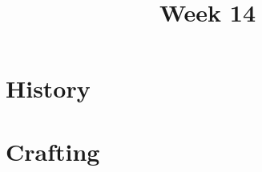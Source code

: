 \documentclass[11pt]{article}
\title{Week 14}
\date{}
\begin{document}
    \maketitle

    \section*{History}
        \begin{itemize}
        \end{itemize}

    \section*{Crafting}
        \begin{itemize}
        \end{itemize}
\end{document}
